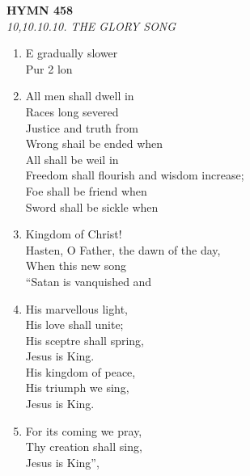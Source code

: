 \documentclass[11pt,a4paper]{article}
\begin{document}
\newpage
\begin{center}
    {\Large \textbf{HYMN 458}}
    \\
    \textit{10,10.10.10. THE GLORY SONG}
\end{center}
\vspace{1em}

\begin{enumerate}
    \item E gradually slower \\
        Pur 2 lon

    \item All men shall dwell in \\
        Races long severed \\
        Justice and truth from \\
        Wrong shail be ended when \\
        All shall be weil in \\
        Freedom shall flourish and wisdom increase; \\
        Foe shall be friend when \\
        Sword shall be sickle when

    \item Kingdom of Christ! \\
        Hasten, O Father, the dawn of the day, \\
        When this new song \\
        ``Satan is vanquished and

    \item His marvellous light, \\
        His love shall unite; \\
        His sceptre shall spring, \\
        Jesus is King. \\
        His kingdom of peace, \\
        His triumph we sing, \\
        Jesus is King.

    \item For its coming we pray, \\
        Thy creation shall sing, \\
        Jesus is King'',


\end{enumerate}
\end{document}
